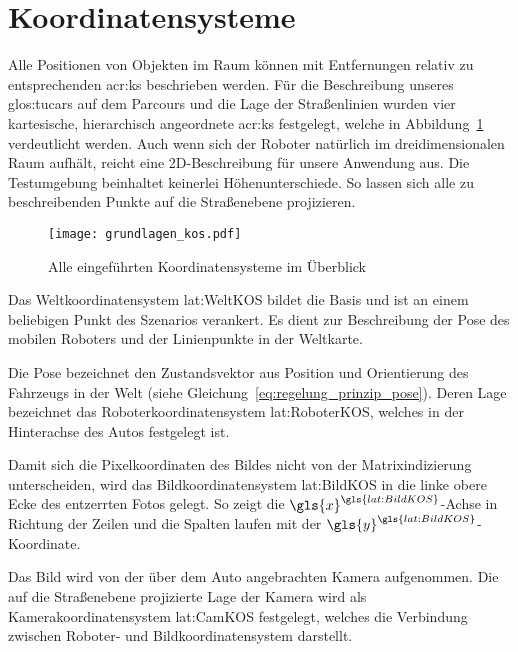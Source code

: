 \section{Koordinatensysteme \dcfirstauthorshort} \label{sec:ks}


Alle Positionen von Objekten im Raum können mit Entfernungen relativ zu entsprechenden \gls{acr:ks} beschrieben werden. Für die Beschreibung unseres \gls{glos:tucar}s auf dem Parcours und die Lage der Straßenlinien wurden vier kartesische, hierarchisch angeordnete \gls{acr:ks} festgelegt, welche in Abbildung~\ref{fig:grundlagen_kos} verdeutlicht werden. Auch wenn sich der Roboter natürlich im dreidimensionalen Raum aufhält, reicht eine 2D-Beschreibung für unsere Anwendung aus. Die Testumgebung beinhaltet keinerlei Höhenunterschiede. So lassen sich alle zu beschreibenden Punkte auf die Straßenebene projizieren. 

\begin{figure}[htbp] %
  \centering
  \texttt{[image: grundlagen\_kos.pdf]}
  \caption{Alle eingeführten Koordinatensysteme im Überblick}
  \label{fig:grundlagen_kos}
\end{figure}

Das Weltkoordinatensystem \gls{lat:WeltKOS} bildet die Basis und ist an einem beliebigen Punkt des Szenarios verankert. Es dient zur Beschreibung der Pose des mobilen Roboters und der Linienpunkte in der Weltkarte. 

Die Pose bezeichnet den Zustandsvektor aus Position und Orientierung des Fahrzeugs in der Welt (siehe Gleichung~\eqref{eq:regelung_prinzip_pose}). Deren Lage bezeichnet das Roboterkoordinatensystem \gls{lat:RoboterKOS}, welches in der Hinterachse des Autos festgelegt ist. 

Damit sich die Pixelkoordinaten des Bildes nicht von der Matrixindizierung unterscheiden, wird das Bildkoordinatensystem \gls{lat:BildKOS} in die linke obere Ecke des entzerrten Fotos gelegt. So zeigt die \( {\gls{x}}^{\gls{lat:BildKOS}} \)-Achse in Richtung der Zeilen und die Spalten laufen mit der \( {\gls{y}}^{\gls{lat:BildKOS}} \)-Koordinate. 

Das Bild wird von der über dem Auto angebrachten Kamera aufgenommen. Die auf die Straßenebene projizierte Lage der Kamera wird als Kamerakoordinatensystem \gls{lat:CamKOS} festgelegt, welches die Verbindung zwischen Roboter- und Bildkoordinatensystem darstellt.

